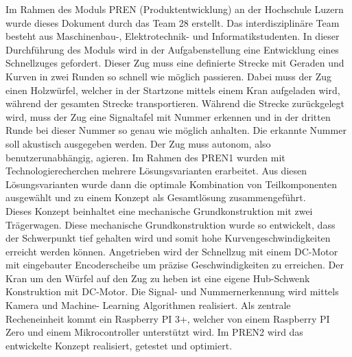 \documentclass[../../main.tex]{subfiles}
\begin{document}
Im Rahmen des Moduls PREN (Produktentwicklung) an der Hochschule Luzern wurde dieses Dokument durch das Team 28
erstellt. Das interdisziplinäre Team besteht aus Maschinenbau-, Elektrotechnik- und Informatikstudenten. In dieser
Durchführung des Moduls wird in der Aufgabenstellung eine Entwicklung eines Schnellzuges gefordert. Dieser Zug muss eine
definierte Strecke mit Geraden und Kurven in zwei Runden so schnell wie möglich passieren. Dabei muss der Zug einen
Holzwürfel, welcher in der Startzone mittels einem Kran aufgeladen wird, während der gesamten Strecke transportieren.
Während die Strecke zurückgelegt wird, muss der Zug eine Signaltafel mit Nummer erkennen und in der dritten Runde bei
dieser Nummer so genau wie möglich anhalten. Die erkannte Nummer soll akustisch ausgegeben werden. Der Zug muss
autonom, also benutzerunabhängig, agieren. Im Rahmen des PREN1 wurden mit Technologierecherchen mehrere Lösungsvarianten
erarbeitet. Aus diesen Lösungsvarianten wurde dann die optimale Kombination von Teilkomponenten ausgewählt und zu einem
Konzept als Gesamtlösung zusammengeführt.\\
Dieses Konzept beinhaltet eine mechanische Grundkonstruktion mit zwei Trägerwagen. Diese mechanische Grundkonstruktion wurde so entwickelt, dass der Schwerpunkt tief gehalten wird und somit hohe Kurvengeschwindigkeiten erreicht werden können. Angetrieben wird der Schnellzug mit einem DC-Motor mit eingebauter Encoderscheibe um präzise Geschwindigkeiten zu erreichen. Der Kran um den Würfel auf den Zug zu heben ist eine eigene Hub-Schwenk Konstruktion mit DC-Motor. Die Signal- und Nummernerkennung wird mittels Kamera und Machine- Learning Algorithmen realisiert. Als zentrale Recheneinheit kommt ein Raspberry PI 3+, welcher von einem Raspberry PI Zero und einem Mikrocontroller unterstützt wird. Im PREN2 wird das entwickelte Konzept realisiert, getestet und optimiert.
\pagebreak
\end{document}
